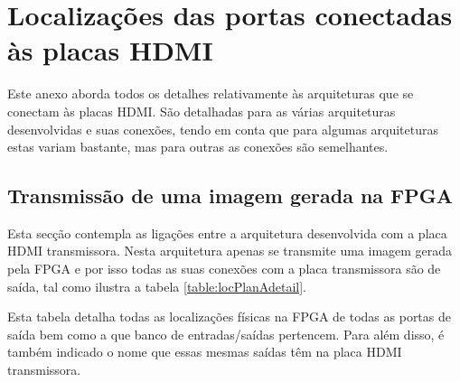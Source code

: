 {\tiny \chapter{Localizações das portas conectadas às placas HDMI} \label{ap3:LOCs}}

Este anexo aborda todos os detalhes relativamente às arquiteturas que se conectam às placas HDMI. São detalhadas para as várias arquiteturas 
desenvolvidas e suas conexões, tendo em conta que para algumas arquiteturas estas variam bastante, mas para outras as conexões são semelhantes.
%
\section{Transmissão de uma imagem gerada na FPGA} \label{ap3:imagemFPGA_TX}
Esta secção contempla as ligações entre a arquitetura desenvolvida com a placa HDMI transmissora. Nesta arquitetura apenas se transmite uma imagem gerada pela FPGA e por isso todas as suas conexões com a placa transmissora são de saída, tal como ilustra a tabela \ref{table:locPlanAdetail}. 

Esta tabela detalha todas as localizações físicas na FPGA de todas as portas de saída bem como a que banco de entradas/saídas pertencem. Para além disso, é também indicado o nome que essas mesmas saídas têm na placa HDMI transmissora.

